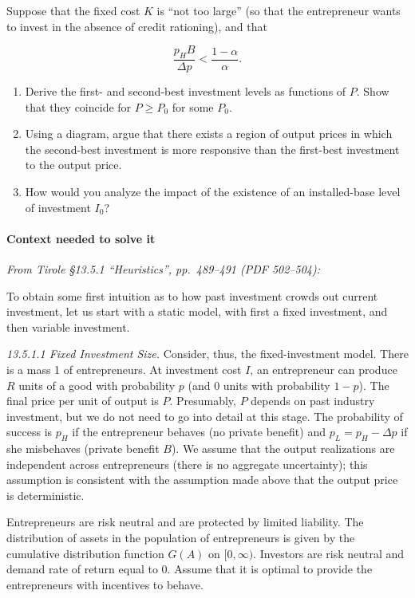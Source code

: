\documentclass[11pt,a4paper]{article}
\begin{document}
Suppose that the fixed cost \(K\) is ``not too large'' (so that the entrepreneur wants to invest in
the absence of credit rationing), and that

\[\frac{p_H B}{\Delta p} < \frac{1 - \alpha}{\alpha}.\]

\begin{enumerate}
\def\labelenumi{(\roman{enumi})}
\item
  Derive the first- and second-best investment levels as functions of \(P\). Show that they coincide
  for \(P \geqslant P_0\) for some \(P_0\).
\item
  Using a diagram, argue that there exists a region of output prices in which the second-best
  investment is more responsive than the first-best investment to the output price.
\item
  How would you analyze the impact of the existence of an installed-base level of investment
  \(I_0\)?
\end{enumerate}

\paragraph{Context needed to solve it}

\emph{From Tirole §13.5.1 ``Heuristics'', pp.~489--491 (PDF 502--504):}

To obtain some first intuition as to how past investment crowds out current investment, let us start
with a static model, with first a fixed investment, and then variable investment.

\emph{13.5.1.1 Fixed Investment Size.} Consider, thus, the fixed-investment model. There is a mass 1
of entrepreneurs. At investment cost \(I\), an entrepreneur can produce \(R\) units of a good with
probability \(p\) (and 0 units with probability \(1 - p\)). The final price per unit of output is
\(P\). Presumably, \(P\) depends on past industry investment, but we do not need to go into detail
at this stage. The probability of success is \(p_H\) if the entrepreneur behaves (no private
benefit) and \(p_L = p_H - \Delta p\) if she misbehaves (private benefit \(B\)). We assume that the
output realizations are independent across entrepreneurs (there is no aggregate uncertainty); this
assumption is consistent with the assumption made above that the output price is deterministic.

Entrepreneurs are risk neutral and are protected by limited liability. The distribution of assets in
the population of entrepreneurs is given by the cumulative distribution function \(G(A)\) on
\([0, \infty)\). Investors are risk neutral and demand rate of return equal to 0. Assume that it is
optimal to provide the entrepreneurs with incentives to behave.
\end{document}
